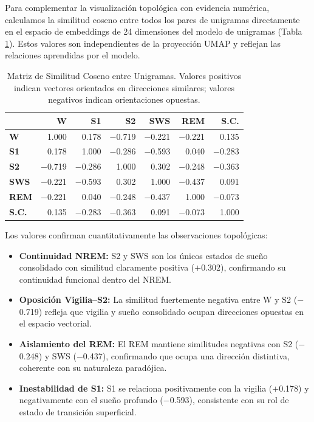 Para complementar la visualización topológica con evidencia numérica, calculamos la similitud coseno entre todos los pares de unigramas directamente en el espacio de embeddings de 24 dimensiones del modelo de unigramas (Tabla \ref{tab:similitud_unigramas}). Estos valores son independientes de la proyección UMAP y reflejan las relaciones aprendidas por el modelo.

\begin{table}[htbp]
    \centering
    \caption{Matriz de Similitud Coseno entre Unigramas. Valores positivos indican vectores orientados en direcciones similares; valores negativos indican orientaciones opuestas.}
    \label{tab:similitud_unigramas}
    \begin{tabular}{lrrrrrr}
        \toprule
        & \textbf{W} & \textbf{S1} & \textbf{S2} & \textbf{SWS} & \textbf{REM} & \textbf{S.C.} \\
        \midrule
        \textbf{W} & 1.000 & 0.178 & $-$0.719 & $-$0.221 & $-$0.221 & 0.135 \\
        \textbf{S1} & 0.178 & 1.000 & $-$0.286 & $-$0.593 & 0.040 & $-$0.283 \\
        \textbf{S2} & $-$0.719 & $-$0.286 & 1.000 & 0.302 & $-$0.248 & $-$0.363 \\
        \textbf{SWS} & $-$0.221 & $-$0.593 & 0.302 & 1.000 & $-$0.437 & 0.091 \\
        \textbf{REM} & $-$0.221 & 0.040 & $-$0.248 & $-$0.437 & 1.000 & $-$0.073 \\
        \textbf{S.C.} & 0.135 & $-$0.283 & $-$0.363 & 0.091 & $-$0.073 & 1.000 \\
        \bottomrule
    \end{tabular}
\end{table}

Los valores confirman cuantitativamente las observaciones topológicas:
\begin{itemize}
    \item \textbf{Continuidad NREM:} S2 y SWS son los únicos estados de sueño consolidado con similitud claramente positiva ($+$0.302), confirmando su continuidad funcional dentro del NREM.
    \item \textbf{Oposición Vigilia--S2:} La similitud fuertemente negativa entre W y S2 ($-$0.719) refleja que vigilia y sueño consolidado ocupan direcciones opuestas en el espacio vectorial.
    \item \textbf{Aislamiento del REM:} El REM mantiene similitudes negativas con S2 ($-$0.248) y SWS ($-$0.437), confirmando que ocupa una dirección distintiva, coherente con su naturaleza paradójica.
    \item \textbf{Inestabilidad de S1:} S1 se relaciona positivamente con la vigilia ($+$0.178) y negativamente con el sueño profundo ($-$0.593), consistente con su rol de estado de transición superficial.
\end{itemize}

